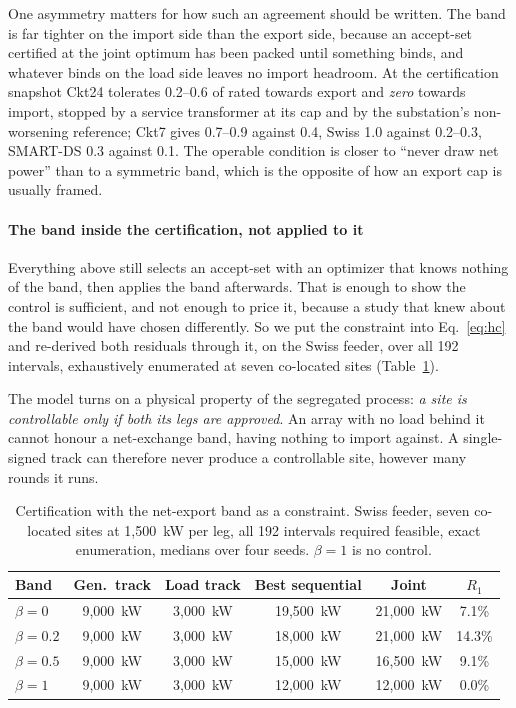 \documentclass[review,authoryear,12pt]{elsarticle}
\begin{document}
One asymmetry matters for how such an agreement should be written. The band is
far tighter on the import side than the export side, because an accept-set
certified at the joint optimum has been packed until something binds, and
whatever binds on the load side leaves no import headroom. At the certification
snapshot Ckt24 tolerates 0.2--0.6 of rated towards export and \emph{zero}
towards import, stopped by a service transformer at its cap and by the
substation's non-worsening reference; Ckt7 gives 0.7--0.9 against 0.4, Swiss
1.0 against 0.2--0.3, SMART-DS 0.3 against 0.1. The operable condition is
closer to ``never draw net power'' than to a symmetric band, which is the
opposite of how an export cap is usually framed.

\paragraph{The band inside the certification, not applied to it}
Everything above still selects an accept-set with an optimizer that knows
nothing of the band, then applies the band afterwards. That is enough to show
the control is sufficient, and not enough to price it, because a study that
knew about the band would have chosen differently. So we put the constraint
into Eq.~\eqref{eq:hc} and re-derived both residuals through it, on the Swiss
feeder, over all 192 intervals, exhaustively enumerated at seven co-located
sites (Table~\ref{tab:banded}).

The model turns on a physical property of the segregated process:
\emph{a site is controllable only if both its legs are approved}. An array with
no load behind it cannot honour a net-exchange band,
having nothing to import against. A single-signed track can therefore never
produce a controllable site, however many rounds it runs.

\begin{table}[htbp]
\centering
\caption{Certification with the net-export band as a constraint. Swiss feeder,
seven co-located sites at 1{,}500~kW per leg, all 192 intervals required
feasible, exact enumeration, medians over four seeds. $\beta=1$ is no control.}
\label{tab:banded}
\small
\begin{tabular}{@{}lccccc@{}}
\toprule
Band & Gen.\ track & Load track & Best sequential & Joint & $R_1$ \\
\midrule
$\beta = 0$   & 9{,}000~kW & 3{,}000~kW & 19{,}500~kW & 21{,}000~kW & 7.1\% \\
$\beta = 0.2$ & 9{,}000~kW & 3{,}000~kW & 18{,}000~kW & 21{,}000~kW & 14.3\% \\
$\beta = 0.5$ & 9{,}000~kW & 3{,}000~kW & 15{,}000~kW & 16{,}500~kW & 9.1\% \\
$\beta = 1$   & 9{,}000~kW & 3{,}000~kW & 12{,}000~kW & 12{,}000~kW & 0.0\% \\
\bottomrule
\end{tabular}
\end{table}
\end{document}
